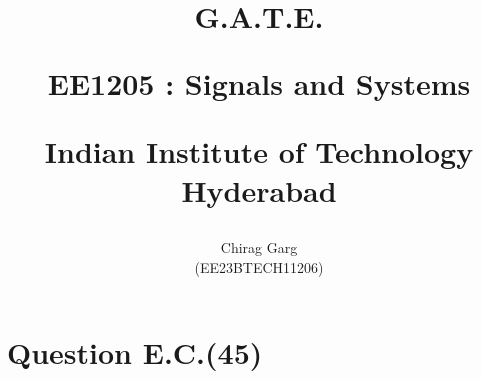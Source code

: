 \documentclass[journal,12pt,twocolumn]{IEEEtran}
\theoremstyle{remark}
\begin{document}
%






\title{
G.A.T.E.

\large{EE1205 : Signals and Systems}

Indian Institute of Technology Hyderabad
}
\author{Chirag Garg

(EE23BTECH11206)
}	





\maketitle

\newpage



\bigskip

\renewcommand{\thefigure}{\theenumi}
\renewcommand{\thetable}{\theenumi}


\section{Question E.C.(45)}
\vspace{0.5cm}
\end{document}
